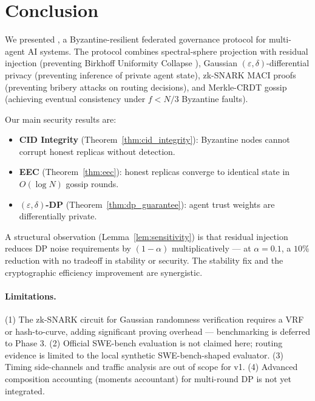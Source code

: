 \section{Conclusion}
\label{sec:conclusion}

We presented \fedsink{}, a Byzantine-resilient federated governance protocol for
multi-agent AI systems.  The protocol combines spectral-sphere projection with residual
injection (preventing Birkhoff Uniformity Collapse \cite{mcfs_iclr2027}), Gaussian
$(\varepsilon,\delta)$-differential privacy (preventing inference of private agent state),
zk-SNARK MACI proofs (preventing bribery attacks on routing decisions), and Merkle-CRDT
gossip (achieving eventual consistency under $f < N/3$ Byzantine faults).

Our main security results are:
\begin{itemize}
  \item \textbf{CID Integrity} (Theorem~\ref{thm:cid_integrity}): Byzantine nodes cannot
    corrupt honest replicas without detection.
  \item \textbf{EEC} (Theorem~\ref{thm:eec}): honest replicas converge to identical state
    in $O(\log N)$ gossip rounds.
  \item \textbf{$(\varepsilon,\delta)$-DP} (Theorem~\ref{thm:dp_guarantee}): agent trust
    weights are differentially private.
\end{itemize}

A structural observation (Lemma~\ref{lem:sensitivity}) is that residual injection reduces
DP noise requirements by $(1-\alpha)$ multiplicatively — at $\alpha{=}0.1$, a $10\%$
reduction with no tradeoff in stability or security.  The stability fix and the
cryptographic efficiency improvement are synergistic.

\paragraph{Limitations.}
(1) The zk-SNARK circuit for Gaussian randomness verification requires a VRF or
hash-to-curve, adding significant proving overhead — benchmarking is deferred to Phase 3.
(2) Official SWE-bench evaluation is not claimed here; routing evidence is limited to
the local synthetic SWE-bench-shaped evaluator.
(3) Timing side-channels and traffic analysis are out of scope for v1.
(4) Advanced composition accounting (moments accountant) for multi-round DP is not yet
integrated.

